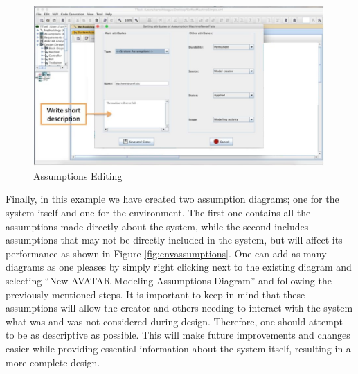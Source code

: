 \documentclass[12pt]{article}
\begin{document}
\begin{figure}[htbp]
\centering
\includegraphics[width=0.99\textwidth]{fig/assumptionsedit.jpg}
\caption{Assumptions Editing} \label{fig:assumptionsedit}
\end{figure}

Finally, in this example we have created two assumption diagrams; one for the system itself and one for the environment. The first one contains all the assumptions made directly about the system, while the second includes assumptions that may not be directly included in the system, but will affect its performance as shown in Figure \ref{fig:envassumptions}. One can add as many diagrams as one pleases by simply right clicking next to the existing diagram and selecting ``New AVATAR Modeling Assumptions Diagram'' and following the previously mentioned steps.
It is important to keep in mind that these assumptions will allow the creator and others needing to interact with the system what was and was not considered during design. Therefore, one should attempt to be as descriptive as possible. This will make future improvements and changes easier while providing essential information about the system itself, resulting in a more complete design. 
\end{document}
